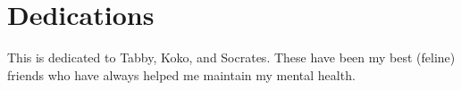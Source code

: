 \chapter{Dedications}
This is dedicated to Tabby, Koko, and Socrates.
These have been my best (feline) friends who have always helped me maintain my mental health.
